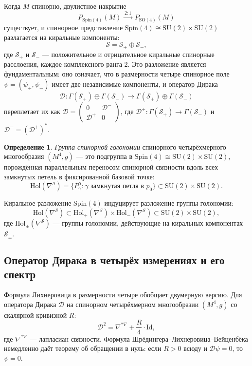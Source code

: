 \documentclass[12pt,a4paper]{article}
\theoremstyle{definition}
\newtheorem{definition}[theorem]{Определение}
\theoremstyle{remark}
\newcommand{\SO}{\mathrm{SO}}
\newcommand{\Spin}{\mathrm{Spin}}
\newcommand{\cD}{\mathcal{D}}
\newcommand{\cS}{\mathcal{S}}
\newcommand{\SU}{\mathrm{SU}}
\newcommand{\Hol}{\mathrm{Hol}}
\begin{document}
Когда $M$ спинорно, двулистное накрытие
\begin{equation}
P_{\Spin(4)}(M) \xrightarrow{\; 2:1 \;} P_{\SO(4)}(M)
\end{equation}
существует, и спинорное представление $\Spin(4) \cong \SU(2) \times \SU(2)$ разлагается на киральные компоненты:
\begin{equation}
\cS = \cS_+ \oplus \cS_-,
\end{equation}
где $\cS_+$ и $\cS_-$ --- положительное и отрицательное киральные спинорные расслоения, каждое комплексного ранга $2$. Это разложение является фундаментальным: оно означает, что в размерности четыре спинорное поле $\psi = (\psi_+, \psi_-)$ имеет две независимые компоненты, и оператор Дирака
\begin{equation}
\cD \colon \Gamma(\cS_+) \oplus \Gamma(\cS_-) \to \Gamma(\cS_+) \oplus \Gamma(\cS_-)
\end{equation}
переплетает их как $\cD = \begin{pmatrix} 0 & \cD^- \\ \cD^+ & 0 \end{pmatrix}$, где $\cD^+ \colon \Gamma(\cS_+) \to \Gamma(\cS_-)$ и $\cD^- = (\cD^+)^*$.

\begin{definition}
\emph{Группа спинорной голономии} спинорного четырёхмерного многообразия $(M^4, g)$ --- это подгруппа в $\Spin(4) \cong \SU(2) \times \SU(2)$, порождённая параллельным переносом спинорной связности вдоль всех замкнутых петель в фиксированной базовой точке:
\begin{equation}
\Hol(\nabla^{\cS}) = \{ P_\gamma^{\cS} : \gamma \text{ замкнутая петля в } p_0 \} \subset \SU(2) \times \SU(2).
\end{equation}
\end{definition}

Киральное разложение $\Spin(4)$ индуцирует разложение группы голономии:
\begin{equation}
\Hol(\nabla^{\cS}) \subset \Hol_+(\nabla^{\cS}) \times \Hol_-(\nabla^{\cS}) \subset \SU(2) \times \SU(2),
\end{equation}
где $\Hol_\pm(\nabla^{\cS})$ --- группы голономии, действующие на киральных компонентах $\cS_\pm$.

\subsection{Оператор Дирака в четырёх измерениях и его спектр}

Формула Лихнеровица в размерности четыре обобщает двумерную версию. Для оператора Дирака $\cD$ на спинорном четырёхмерном многообразии $(M^4, g)$ со скалярной кривизной $R$:
\begin{equation}
\cD^2 = \nabla^{*\nabla} + \frac{R}{4} \cdot \mathrm{Id},
\end{equation}
где $\nabla^{*\nabla}$ --- лапласиан связности. Формула Шрёдингера--Лихнеровица--Вейценбёка немедленно даёт теорему об обращении в нуль: если $R > 0$ всюду и $\cD\psi = 0$, то $\psi = 0$.
\end{document}
